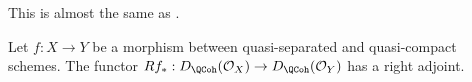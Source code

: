 \begin{lemma}
\label{lemma-twisted-inverse-image}
\begin{reference}
This is almost the same as \cite[Example 4.2]{Neeman-Grothendieck}.
\end{reference}
Let $f : X \to Y$ be a morphism between quasi-separated and quasi-compact
schemes. The functor $Rf_* : D_\QCoh(\mathcal{O}_X) \to D_\QCoh(\mathcal{O}_Y)$
has a right adjoint.
\end{lemma}